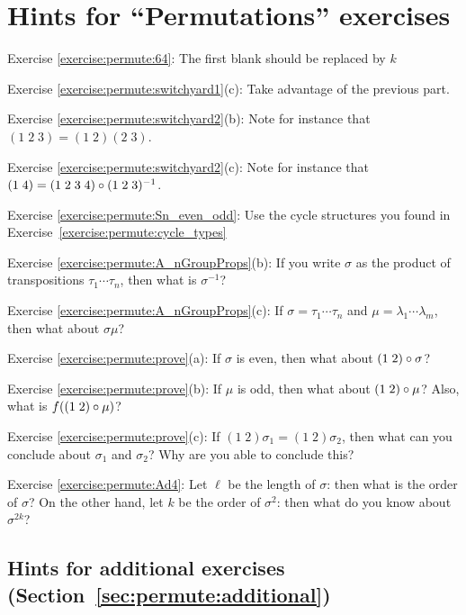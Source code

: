 \section{Hints for ``Permutations'' exercises}
\label{sec:Permutation:Hints} 

\noindent Exercise \ref{exercise:permute:64}: The first blank should be replaced by $k$

\noindent Exercise \ref{exercise:permute:switchyard1}(c): Take advantage of the previous part.

\noindent Exercise \ref{exercise:permute:switchyard2}(b): Note for instance that $(1 \;2 \; 3) = (1 \; 2) (2 \; 3)$.

\noindent Exercise \ref{exercise:permute:switchyard2}(c): Note for instance that $(1 \;4 ) = (1 \; 2 \; 3 \; 4) \circ (1 \; 2 \; 3 )^{-1}$.

\noindent Exercise \ref{exercise:permute:Sn_even_odd}: Use the cycle structures you found in Exercise~\ref{exercise:permute:cycle_types}


\noindent Exercise \ref{exercise:permute:A_nGroupProps}(b): If you write $\sigma$ as the product of transpositions $\tau_1 \cdots \tau_{n}$, then what is $\sigma^{-1}$?

\noindent Exercise \ref{exercise:permute:A_nGroupProps}(c): If $\sigma = \tau_1 \cdots \tau_{n}$ and $\mu = \lambda_1 \cdots \lambda_{m}$, then what about $\sigma \mu$?

\noindent Exercise \ref{exercise:permute:prove}(a): If $\sigma$ is even, then what about $(1 \; 2) \circ \sigma$?

\noindent Exercise \ref{exercise:permute:prove}(b): If $\mu$ is odd, then what about $(1 \; 2) \circ \mu$? Also, what is $f( (1 \; 2) \circ \mu )$?

\noindent Exercise \ref{exercise:permute:prove}(c): If $(1 \; 2) \sigma_1 = (1 \; 2) \sigma_2$, then what can you conclude about $\sigma_1$ and $\sigma_2$? Why are you able to conclude this?


\noindent Exercise \ref{exercise:permute:Ad4}: Let $\ell$ be the length of $\sigma$: then what is the order of $\sigma$? On the other hand, let $k$ be the order of $\sigma^2$: then what do you know about $\sigma^{2k}$?


\bigskip

\subsection{Hints for additional exercises (Section~\ref{sec:permute:additional})}

